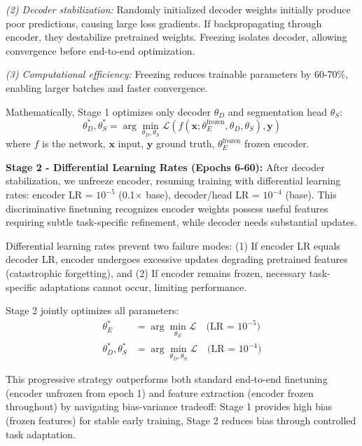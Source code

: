 \documentclass{article}
\begin{document}
\textit{(2) Decoder stabilization:} Randomly initialized decoder weights initially produce poor predictions, causing large loss gradients. If backpropagating through encoder, they destabilize pretrained weights. Freezing isolates decoder, allowing convergence before end-to-end optimization.

\textit{(3) Computational efficiency:} Freezing reduces trainable parameters by 60-70\%, enabling larger batches and faster convergence.

Mathematically, Stage 1 optimizes only decoder $\theta_D$ and segmentation head $\theta_S$:
\begin{equation}
\theta_D^*, \theta_S^* = \arg\min_{\theta_D, \theta_S} \mathcal{L}(f(\mathbf{x}; \theta_E^{\text{frozen}}, \theta_D, \theta_S), \mathbf{y})
\end{equation}
where $f$ is the network, $\mathbf{x}$ input, $\mathbf{y}$ ground truth, $\theta_E^{\text{frozen}}$ frozen encoder.

\textbf{Stage 2 - Differential Learning Rates (Epochs 6-60):}
After decoder stabilization, we unfreeze encoder, resuming training with differential learning rates: encoder LR = $10^{-5}$ (0.1$\times$ base), decoder/head LR = $10^{-4}$ (base). This discriminative finetuning \cite{howard2018universal} recognizes encoder weights possess useful features requiring subtle task-specific refinement, while decoder needs substantial updates.

Differential learning rates prevent two failure modes: (1) If encoder LR equals decoder LR, encoder undergoes excessive updates degrading pretrained features (catastrophic forgetting), and (2) If encoder remains frozen, necessary task-specific adaptations cannot occur, limiting performance.

Stage 2 jointly optimizes all parameters:
\begin{equation}
\begin{aligned}
\theta_E^* &= \arg\min_{\theta_E} \mathcal{L} \quad \text{(LR = } 10^{-5}\text{)} \\
\theta_D^*, \theta_S^* &= \arg\min_{\theta_D, \theta_S} \mathcal{L} \quad \text{(LR = } 10^{-4}\text{)}
\end{aligned}
\end{equation}

This progressive strategy outperforms both standard end-to-end finetuning (encoder unfrozen from epoch 1) and feature extraction (encoder frozen throughout) by navigating bias-variance tradeoff: Stage 1 provides high bias (frozen features) for stable early training, Stage 2 reduces bias through controlled task adaptation.
\end{document}
